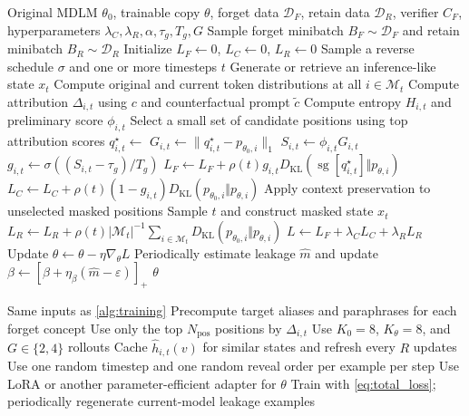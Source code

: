 \documentclass[10pt]{article}
\newcommand{\KL}{D_{\mathrm{KL}}}
\newcommand{\DF}{\mathcal{D}_{F}}
\newcommand{\DR}{\mathcal{D}_{R}}
\newcommand{\M}{\mathcal{M}}
\newcommand{\sg}{\operatorname{sg}}
\newcommand{\1}{\mathbb{I}}
\begin{document}
\begin{algorithm}[t]
\caption{TIDE-U training}
\label{alg:training}
\begin{algorithmic}[1]
\Require Original MDLM $\theta_0$, trainable copy $\theta$, forget data $\DF$, retain data $\DR$, verifier $C_F$, hyperparameters $\lambda_C,\lambda_R,\alpha,\tau_g,T_g,G$
    \State Sample forget minibatch $B_F\sim\DF$ and retain minibatch $B_R\sim\DR$
    \State Initialize $L_F\gets0$, $L_C\gets0$, $L_R\gets0$
        \State Sample a reverse schedule $\sigma$ and one or more timesteps $t$
        \State Generate or retrieve an inference-like state $x_t$
        \State Compute original and current token distributions at all $i\in\M_t$
        \State Compute attribution $\Delta_{i,t}$ using $c$ and counterfactual prompt $\widetilde c$
        \State Compute entropy $H_{i,t}$ and preliminary score $\phi_{i,t}$
        \State Select a small set of candidate positions using top attribution scores
            \State $q_{i,t}^\star\gets$ 
            \State $G_{i,t}\gets\|q_{i,t}^\star-p_{\theta_0,i}\|_1$
            \State $S_{i,t}\gets\phi_{i,t}G_{i,t}$
            \State $g_{i,t}\gets\sigma((S_{i,t}-\tau_g)/T_g)$
            \State $L_F\gets L_F+\rho(t)g_{i,t}\KL(\sg[q_{i,t}^\star]\Vert p_{\theta,i})$
            \State $L_C\gets L_C+\rho(t)(1-g_{i,t})\KL(p_{\theta_0,i}\Vert p_{\theta,i})$
        \EndFor
        \State Apply context preservation to unselected masked positions
    \EndFor
        \State Sample $t$ and construct masked state $x_t$
        \State $L_R\gets L_R+\rho(t)|\M_t|^{-1}\sum_{i\in\M_t}\KL(p_{\theta_0,i}\Vert p_{\theta,i})$
    \EndFor
    \State $L\gets L_F+\lambda_C L_C+\lambda_R L_R$
    \State Update $\theta\gets\theta-\eta\nabla_\theta L$
    \State Periodically estimate leakage $\widehat m$ and update $\beta\gets[\beta+\eta_\beta(\widehat m-\varepsilon)]_+$
\EndFor
\State \Return $\theta$
\end{algorithmic}
\end{algorithm}

\begin{algorithm}[t]
\caption{Low-cost practical variant}
\label{alg:cheap}
\begin{algorithmic}[1]
\Require Same inputs as \cref{alg:training}
\State Precompute target aliases and paraphrases for each forget concept
\State Use only the top $N_{\mathrm{pos}}$ positions by $\Delta_{i,t}$
\State Use $K_0=8$, $K_\theta=8$, and $G\in\{2,4\}$ rollouts
\State Cache $\widehat h_{i,t}(v)$ for similar states and refresh every $R$ updates
\State Use one random timestep and one random reveal order per example per step
\State Use LoRA or another parameter-efficient adapter for $\theta$
\State Train with \cref{eq:total_loss}; periodically regenerate current-model leakage examples
\end{algorithmic}
\end{algorithm}
\end{document}
